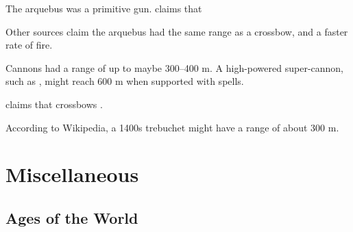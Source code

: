 \begin{gloss}
    The arquebus was a primitive gun. 
    \cite{GarrettsBridges} claims that 
    
    Other sources claim the arquebus had the same range as a crossbow, and a faster rate of fire.
  
    Cannons had a range of up to maybe 300--400 m.
    A high-powered super-cannon, such as , might reach 600 m when supported with spells. 
  
    \cite{GarrettsBridges} claims that crossbows . 
  
    According to Wikipedia, a 1400s trebuchet might have a range of about 300 m.
\end{gloss}







































\chapter{Miscellaneous}















\section{Ages of the World}









